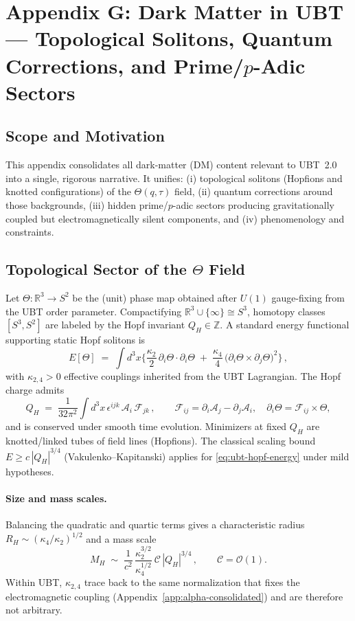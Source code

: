 
\section{Appendix G: Dark Matter in UBT --- Topological Solitons, Quantum Corrections, and Prime/$p$-Adic Sectors}
\label{app:dm-consolidated}

\subsection{Scope and Motivation}
This appendix consolidates all dark-matter (DM) content relevant to UBT~2.0 into a single, rigorous narrative.
It unifies: (i) topological solitons (Hopfions and knotted configurations) of the $\Theta(q,\tau)$ field,
(ii) quantum corrections around those backgrounds, (iii) hidden prime/$p$-adic sectors producing gravitationally coupled but electromagnetically silent components,
and (iv) phenomenology and constraints.

\subsection{Topological Sector of the $\Theta$ Field}
Let $\Theta:\mathbb{R}^3\!\to\!S^2$ be the (unit) phase map obtained after $U(1)$ gauge-fixing from the UBT order parameter.
Compactifying $\mathbb{R}^3\cup\{\infty\}\cong S^3$, homotopy classes $[S^3,S^2]$ are labeled by the Hopf invariant $Q_H\in\mathbb{Z}$.
A standard energy functional supporting static Hopf solitons is
\begin{equation}
\label{eq:ubt-hopf-energy}
E[\Theta] \;=\; \int d^3x \Big\{ \frac{\kappa_2}{2}\,\partial_i\Theta\!\cdot\!\partial_i\Theta \;+\; \frac{\kappa_4}{4}\,\big(\partial_i\Theta\times\partial_j\Theta\big)^2 \Big\}\,,
\end{equation}
with $\kappa_{2,4}>0$ effective couplings inherited from the UBT Lagrangian. The Hopf charge admits
\begin{equation}
Q_H \;=\; \frac{1}{32\pi^2}\int d^3x\,\epsilon^{ijk}\,\mathcal{A}_i\,\mathcal{F}_{jk}\,,\qquad
\mathcal{F}_{ij}=\partial_i\mathcal{A}_j-\partial_j\mathcal{A}_i,\quad
\partial_i\Theta=\mathcal{F}_{ij}\times \Theta,
\end{equation}
and is conserved under smooth time evolution. Minimizers at fixed $Q_H$ are knotted/linked tubes of field lines (Hopfions).
The classical scaling bound $E \ge c\,|Q_H|^{3/4}$ (Vakulenko--Kapitanski) applies for \eqref{eq:ubt-hopf-energy} under mild hypotheses.

\paragraph{Size and mass scales.}
Balancing the quadratic and quartic terms gives a characteristic radius $R_H\sim(\kappa_4/\kappa_2)^{1/2}$ and a mass scale
\begin{equation}
M_H \;\sim\; \frac{1}{c^2}\,\frac{\kappa_2^{3/2}}{\kappa_4^{1/2}}\ \mathcal{C}\,|Q_H|^{3/4}\,,\qquad \mathcal{C}=\mathcal{O}(1).
\end{equation}
Within UBT, $\kappa_{2,4}$ trace back to the same normalization that fixes the electromagnetic coupling (Appendix~\ref{app:alpha-consolidated})
and are therefore not arbitrary.

